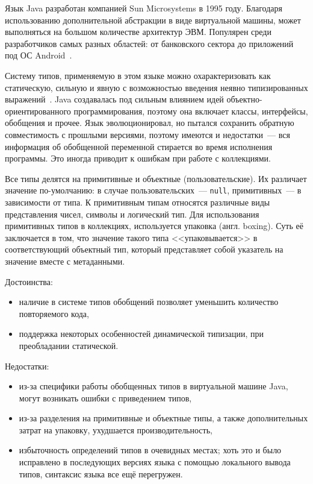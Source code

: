 Язык Java разработан компанией Sun Microsystems в 1995 году.
Благодаря использованию дополнительной абстракции в виде виртуальной машины, может выполняться на большом количестве архитектур ЭВМ.
Популярен среди разработчиков самых разных областей: от банковского сектора до приложений под ОС Android~\cite{JavaUsage}.

Систему типов, применяемую в этом языке можно охарактеризовать как статическую, сильную и явную с возможностью введения неявно типизированных выражений~\cite{JavaTypeSystem}.
Java создавалась под сильным влиянием идей объектно-ориентированного программирования, поэтому она включает классы, интерфейсы, обобщения и прочее.
Язык эволюционировал, но пытался сохранить обратную совместимость с прошлыми версиями, поэтому имеются и недостатки~--- вся информация об обобщенной переменной стирается во время исполнения программы.
Это иногда приводит к ошибкам при работе с коллекциями.

Все типы делятся на примитивные и объектные (пользовательские).
Их различает значение по-умолчанию: в случае пользовательских~--- \lstinline{null}, примитивных~--- в зависимости от типа.
К примитивным типам относятся различные виды представления чисел, символы и логический тип.
Для использования примитивных типов в коллекциях, используется упаковка (англ. boxing).
Суть её заключается в том, что значение такого типа <<упаковывается>> в соответствующий объектный тип, который представляет собой указатель на значение вместе с метаданными.

Достоинства:
\begin{itemize}
    \item наличие в системе типов обобщений позволяет уменьшить количество повторяемого кода,
    \item поддержка некоторых особенностей динамической типизации, при преобладании статической.
\end{itemize}

Недостатки:
\begin{itemize}
    \item из-за специфики работы обобщенных типов в виртуальной машине Java, могут возникать ошибки с приведением типов,
    \item из-за разделения на примитивные и объектные типы, а также дополнительных затрат на упаковку, ухудшается производительность,
    \item избыточность определений типов в очевидных местах; хоть это и было исправлено в последующих версиях языка с помощью локального вывода типов, синтаксис языка все ещё перегружен.
\end{itemize}

